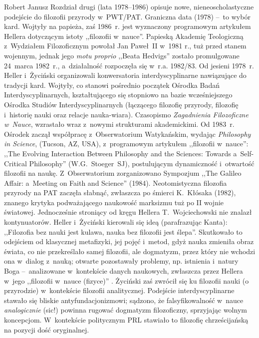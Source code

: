 \begin{newrevplenv}{Robert Janusz}
Rozdział drugi (lata 1978--1986) opisuje nowe, nieneoscholastyczne podejście do filozofii przyrody w~PWT/PAT. Graniczna data (1978) --~to wybór kard. Wojtyły na papieża, zaś 1986~r. jest wyznaczony programowym artykułem Hellera dotyczącym istoty ,,filozofii w~nauce''. Papieską Akademię Teologiczną z~Wydziałem Filozoficznym powołał Jan Paweł~II w~1981 r., tuż przed stanem wojennym, jednak jego \textit{motu proprio} ,,Beata Hedvigs'' zostało promulgowane 24~marca 1982~r., a~działalność rozpoczęła się w~r.a. 1982/83. Od jesieni 1978~r. Heller i~Życiński organizowali konwersatoria interdyscyplinarne nawiązujące do tradycji kard. Wojtyły, co stanowi pośrednio początek Ośrodka Badań Interdyscyplinarnych, kształtującego się stopniowo na bazie wcześniejszego Ośrodka Studiów Interdyscyplinarnych (łączącego filozofię przyrody, filozofię i~historię nauki oraz relacje nauka-wiara). Czasopismo \textit{Zagadnienia Filozoficzne w~Nauce}, wzrastało wraz z~nowymi strukturami akademickimi. Od 1983~r. Ośrodek zaczął współpracę z~Obserwatorium Watykańskim, wydając \textit{Philosophy in Science}, (Tucson, AZ, USA), z~programowym artykułem ,,filozofii w~nauce'': ,,The Evolving Interaction Between Philosophy and the Sciences: Towards a~Self-Critical Philosophy'' (W.G.~Stoeger~SJ), postulującym dynamiczność i~otwartość filozofii na naukę. Z~Obserwatorium zorganizowano Sympozjum ,,The Galileo Affair: a~Meeting on Faith and Science'' (1984). Neotomistyczna filozofia przyrody na PAT zaczęła słabnąć, zwłaszcza po śmierci K.~Kłósaka (1982), znanego krytyka podważającego naukowość marksizmu tuż po II wojnie światowej. Jednocześnie stroniący od kręgu Hellera T.~Wojciechowski nie znalazł kontynuatorów. Heller i~Życiński kierowali się ideą (parafrazując Kanta): ,,Filozofia bez nauki jest kulawa, nauka bez filozofii jest ślepa''. Skutkowało to odejściem od klasycznej metafizyki, jej pojęć i~metod, gdyż nauka zmieniła obraz świata, co nie przekreślało samej filozofii, ale dogmatyzm, przez który nie wchodzi ona w~dialog z~nauką; otwarte pozostawały problemy, np. istnienia i~natury Boga --~analizowane w~kontekście danych naukowych, zwłaszcza przez Hellera w~jego ,,filozofii w~nauce (fizyce)''
\parencites[zob.][]{heller_how_2019}[zob. także][]{polak_philosophy_2019}. %
 Życiński zaś zwrócił się ku filozofii nauki (o przyrodzie) w~kontekście filozofii analitycznej. Podejście interdyscyplinarne stawało się bliskie antyfundacjonizmowi; sądzono, że falsyfikowalność w~nauce \textit{analogicznie} (sic!) powinna rugować dogmatyzm filozoficzny, sprzyjając wolnym koncepcjom. W~kontekście politycznym PRL stawiało to filozofię chrześcijańską na pozycji dość oryginalnej.


\end{newrevplenv}
